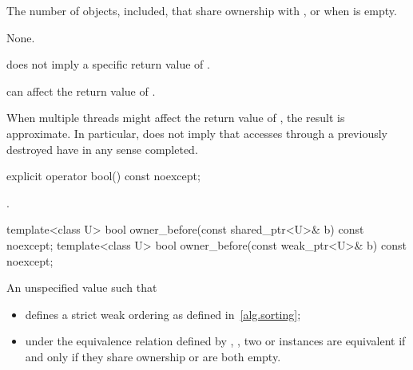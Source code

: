 \begin{itemdescr}
\pnum
\returns
The number of  objects,  included,
that share ownership with , or  when  is
empty.

\pnum
\sync
None.

\pnum
\begin{note}
does not imply a specific return value of .
\end{note}

\pnum
\begin{note}
can affect the return value of .
\end{note}

\pnum
\begin{note}
When multiple threads
might affect the return value of ,
the result is approximate.
In particular,  does not imply that accesses through
a previously destroyed  have in any sense completed.
\end{note}
\end{itemdescr}

%
\begin{itemdecl}
explicit operator bool() const noexcept;
\end{itemdecl}

\begin{itemdescr}
\pnum
\returns
{}.
\end{itemdescr}

%
\begin{itemdecl}
template<class U> bool owner_before(const shared_ptr<U>& b) const noexcept;
template<class U> bool owner_before(const weak_ptr<U>& b) const noexcept;
\end{itemdecl}

\begin{itemdescr}
\pnum
\returns
An unspecified value such that
\begin{itemize}
\item {} defines a strict weak ordering as defined in~\ref{alg.sorting};

\item under the equivalence relation defined by ,
, two  or
 instances are equivalent if and only if they share ownership or
are both empty.
\end{itemize}

\end{itemdescr}

